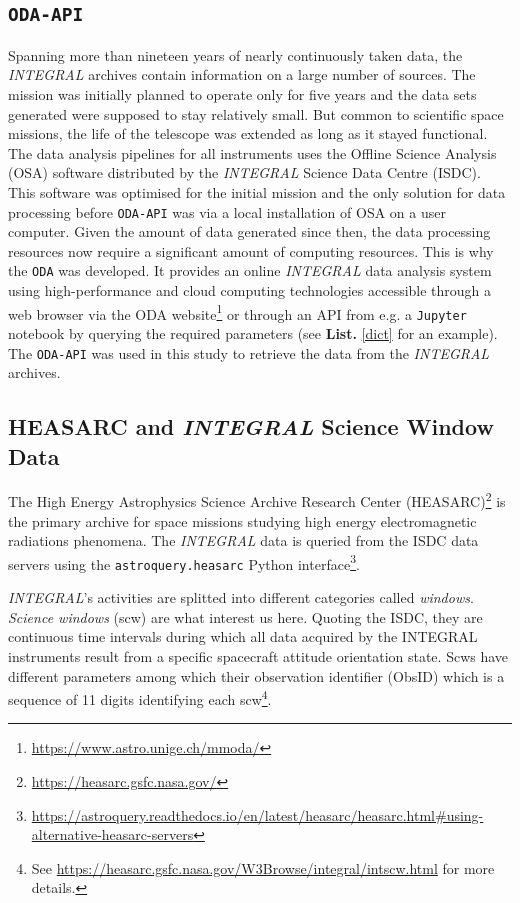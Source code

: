    \subsection{\texttt{ODA-API}}

    Spanning more than nineteen years of nearly continuously taken data, the \textit{INTEGRAL} archives contain information on a large number of sources. The mission was initially planned to operate only for five years and the data sets generated were supposed to stay relatively small\cite{Neronov2020AnTelescope}. But common to scientific space missions, the life of the telescope was extended as long as it stayed functional. The data analysis pipelines for all instruments uses the Offline Science Analysis (OSA) software distributed by the \textit{INTEGRAL} Science Data Centre (ISDC). This software was optimised for the initial mission and the only solution for data processing before \texttt{ODA-API} was via a local installation of OSA on a user computer. Given the amount of data generated since then, the data processing resources now require a significant amount of computing resources. This is why the \texttt{ODA} was developed\cite{Neronov2020AnTelescope}. It provides an online \textit{INTEGRAL} data analysis system using high-performance and cloud computing technologies accessible through a web browser via the ODA website\footnote{\url{https://www.astro.unige.ch/mmoda/}} or through an API from e.g. a \texttt{Jupyter} notebook by querying the required parameters (see \textbf{List.} \ref{dict} for an example). The \texttt{ODA-API} was used in this study to retrieve the data from the \textit{INTEGRAL} archives.

    \subsection{HEASARC and \textit{INTEGRAL} Science Window Data}

    The High Energy Astrophysics Science Archive Research Center (HEASARC)\footnote{\url{https://heasarc.gsfc.nasa.gov/}} is the primary archive for space missions studying high energy electromagnetic radiations phenomena. The \textit{INTEGRAL} data is queried from the ISDC data servers using the \texttt{astroquery.heasarc} Python interface\footnote{\url{https://astroquery.readthedocs.io/en/latest/heasarc/heasarc.html\#using-alternative-heasarc-servers}}.

    \textit{INTEGRAL}'s activities are splitted into different categories called \textit{windows}. \textit{Science windows} (scw) are what interest us here. Quoting the ISDC, they are continuous time intervals during which all data acquired by the INTEGRAL instruments result from a specific spacecraft attitude orientation state. Scws have different parameters among which their observation identifier (Obs\textunderscore ID) which is a sequence of 11 digits identifying each scw\footnote{See \url{https://heasarc.gsfc.nasa.gov/W3Browse/integral/intscw.html} for more details.}.
    

